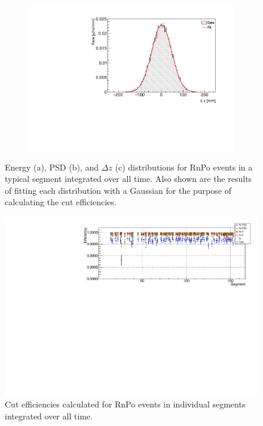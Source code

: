 \begin{figure}[H]
\begin{subfigure}{0.5\linewidth}
	\caption{}
	\label{fig:rnpopsdseg76}
\end{subfigure}
\begin{subfigure}{1\linewidth}
	\centering
	\includegraphics[width=0.475\linewidth]{tex/6-ac227-images/AD_RateCalc/RnPoDz_Seg76}
	\caption{}
	\label{fig:rnpodzseg76}
\end{subfigure}
\caption{Energy (a), PSD (b), and $\Delta z$ (c) distributions for RnPo events in a typical segment integrated over all time. Also shown are the results of fitting each distribution with a Gaussian for the purpose of calculating the cut efficiencies.}
\label{fig:RnPoDist}
\end{figure}

\begin{figure}[h]
	\centering
	\includegraphics[width=0.9\linewidth]{tex/6-ac227-images/AD_RateCalc/EfficiencyPerCell}
	\caption{Cut efficiencies calculated for RnPo events in individual segments integrated over all time.}
	\label{fig:efficiencypercell}
\end{figure}

